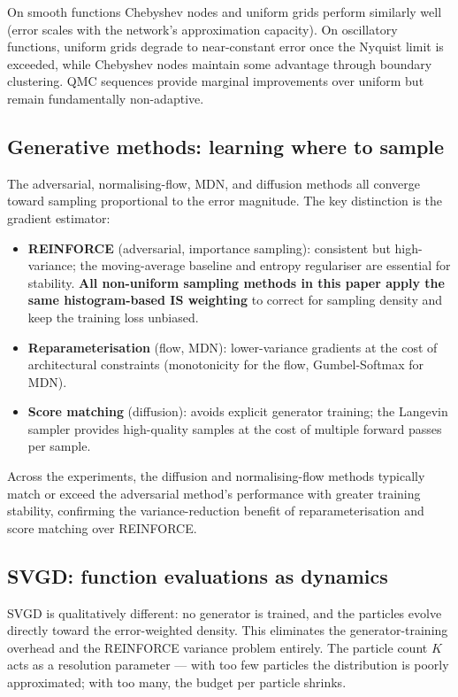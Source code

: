 \documentclass[11pt,a4paper]{article}
\begin{document}
On smooth functions Chebyshev nodes and uniform grids perform similarly
well (error scales with the network's approximation capacity).  On
oscillatory functions, uniform grids degrade to near-constant error once
the Nyquist limit is exceeded, while Chebyshev nodes maintain some
advantage through boundary clustering.  QMC sequences provide marginal
improvements over uniform but remain fundamentally non-adaptive.

\subsection{Generative methods: learning where to sample}

The adversarial, normalising-flow, MDN, and diffusion methods all
converge toward sampling proportional to the error magnitude.  The key
distinction is the gradient estimator:

\begin{itemize}
  \item \textbf{REINFORCE} (adversarial, importance sampling):
        consistent but high-variance; the moving-average baseline and
        entropy regulariser are essential for stability.  \textbf{All non-uniform sampling methods in this paper
apply the same histogram-based IS weighting} to correct for sampling
density and keep the training loss unbiased.
  \item \textbf{Reparameterisation} (flow, MDN):
        lower-variance gradients at the cost of architectural constraints
        (monotonicity for the flow, Gumbel-Softmax for MDN).
  \item \textbf{Score matching} (diffusion):
        avoids explicit generator training; the Langevin sampler provides
        high-quality samples at the cost of multiple forward passes per
        sample.
\end{itemize}

Across the experiments, the diffusion and normalising-flow methods
typically match or exceed the adversarial method's performance with
greater training stability, confirming the variance-reduction benefit of
reparameterisation and score matching over REINFORCE.

\subsection{SVGD: function evaluations as dynamics}

SVGD is qualitatively different: no generator is trained, and the
particles evolve directly toward the error-weighted density.  This
eliminates the generator-training overhead and the REINFORCE variance
problem entirely.  The particle count $K$ acts as a resolution parameter
--- with too few particles the distribution is poorly approximated; with
too many, the budget per particle shrinks.
\end{document}

